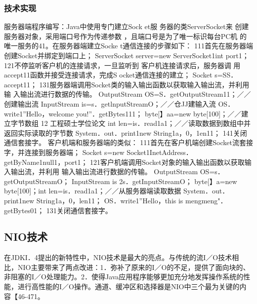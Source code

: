 \subsubsection*{技术实现}
服务器端程序编写：Java中使用专门建立Sock
et服
务器的类ServerSocket来
创建服务器对象，采用端口号作为传递参数
，且端口号是为了唯一标识每台PC机
的唯一服务的41。在服务器端建立Socke
t通信连接的步骤如下：
111首先在服务器端创建Socket并绑定到端口上；
ServerSocket server=new ServerSocket1int port1；
121不停监听客户机的连接请求，一旦监听到
客户机连接请求后，服务器调
用accept11函数并接受连接请求，完成S
ocket通信连接的建立；
Socket
s=SS．accept11；
131服务器端调用Socket类的输入输出函数以获取输入输出流，并利用输
入输出流进行数据的传输。
OutputStream OS=S．getOutputStream11；／／创建输出流
InputStream is=s．getlnputStreamO；／／仓JJ建输入流
OS．write1”Hello，welcome you!”．getBytes111；
byte[】aa=new byte[100]；／／建立字节数组
12
工程硕士学位论文
int len=is．read1a1；／／读取数据到数组中并返回实际读取的字节数
System．out．print1new String1a，0，1en11；
141关闭通信套接字。
客户机端和服务器端的类似：
111首先在客户机端创建Socket流套接字，并连接到服务器端；
Socket s=new
Socket1InetAddress．getByName1null1，port1；
121客户机端调用Socket对象的输入输出函数以获取输入输出流，并利用
输入输出流进行数据的传输。
OutputStream OS=s．getOutputStreamO；
InputStream
is 2s．getInputStreamO；
byte[】a=new byte[100]；int len=is．read1a1；／／从服务器端读取数据
System．out．print1new String1a，0，len11；
OS．write1”Hello，this
is
mengmeng"．getBytes01；
131关闭通信套接字。
\subsection*{NIO技术}
在JDKI．4提出的新特性中，NIO技术是最大的亮点。与传统的流I／O技术相
比，NIO主要带来了两点改进：1．弥补了原来的I／O的不足，提供了面向块的、
非阻塞的I／O处理能力。2．使得Java应用程序能够更加充分地发挥操作系统的性
能，进行高性能的I／O操作。通道、缓冲区和选择器是NIO中三个最为关键的内
容【46-471。
